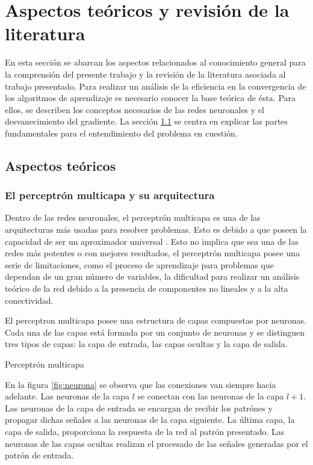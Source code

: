\chapter{Aspectos teóricos y revisión de la literatura}
En esta sección se abarcan los aspectos relacionados al conocimiento general para la comprensión del presente trabajo y la revisión de la literatura asociada al trabajo presentado. Para realizar un análisis de la eficiencia en la convergencia de los algoritmos de aprendizaje es necesario conocer la base teórica de ésta. Para ellos, se describen los conceptos necesarios de las redes neuronales y el desvanecimiento del gradiente. La sección \ref{sec:aspectos_teoricos} se centra en explicar las partes fundamentales para el entendimiento del problema en cuestión.

\section{Aspectos teóricos}\label{sec:aspectos_teoricos}
\subsection{El perceptrón multicapa y su arquitectura}
Dentro de las redes neuronales, el perceptrón multicapa es una de las arquitecturas más usadas para resolver problemas. Esto es debido a que poseen la capacidad de ser un aproximador universal \cite{Minsky1969b}. Esto no implica que sea una de las redes más potentes o con mejores resultados, el perceptrón multicapa posee una serie de limitaciones, como el proceso de aprendizaje para problemas que dependan de un gran número de variables, la dificultad para realizar un análisis teórico de la red debido a la presencia de componentes no lineales y a la alta conectividad.

El perceptron multicapa posee una estructura de capas compuestas por neuronas. Cada una de las capas está formada por un conjunto de neuronas y se distinguen tres tipos de capas: la capa de entrada, las capas ocultas y la capa de salida.

\begin{imagen}
	\scalebox{0.8}{}
	\caption{Perceptrón multicapa}
	\label{fig:neurona}
\end{imagen}

En la figura \ref{fig:neurona} se observa que las conexiones van siempre hacia adelante. Las neuronas de la capa $l$ se conectan con las neuronas de la capa $l + 1$. Las neuronas de la capa de entrada se encargan de recibir los patrónes y propagar dichas señales a las neuronas de la capa siguiente. La última capa, la capa de salida, proporciona la respuesta de la red al patrón presentado. Las neuronas de las capas ocultas realizan el procesado de las señales generadas por el patrón de entrada.

